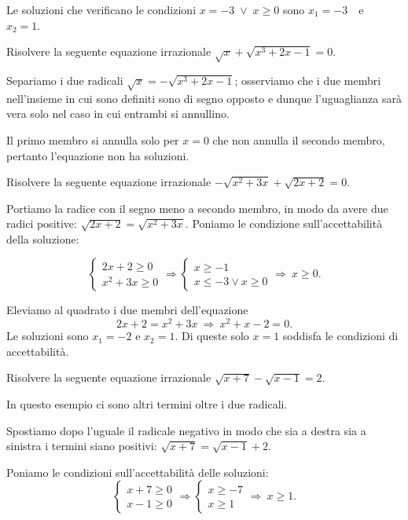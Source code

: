 \begin{exrig}
\begin{esempio}
Le soluzioni che verificano le condizioni $x=-3\;\vee\; x\ge 0$ sono $x_1=-3$~~e~~$x_2=1$.
\end{esempio}
\begin{esempio}
Risolvere la seguente equazione irrazionale $\sqrt x+\sqrt{x^3+2x-1}=0$.

Separiamo i due radicali $\sqrt x=-\sqrt{x^3+2x-1}$; osserviamo che i due membri nell'insieme in cui sono definiti sono di segno opposto e dunque l'uguaglianza sarà vera solo nel caso in cui entrambi si annullino.

Il primo membro si annulla solo per $x=0$ che non annulla il secondo membro, pertanto l'equazione non ha soluzioni.
\end{esempio}
\begin{esempio}
Risolvere la seguente equazione irrazionale $-\sqrt{x^2+3x}+\sqrt{2x+2}=0$.

Portiamo la radice con il segno meno a secondo membro, in modo da avere due radici positive:
$\sqrt{2x+2}=\sqrt{x^2+3x}$. Poniamo le condizione sull'accettabilità della soluzione:

\begin{equation*}
\left\{\begin{array}{l}{2x+2\ge 0}\\{x^2+3x\ge 0}\end{array}\right. \Rightarrow \left\{\begin{array}{l}{x\ge -1}\\{x\le -3\vee x\ge 0}\end{array}\right.\Rightarrow\: x\ge 0.
\end{equation*}

Eleviamo al quadrato i due membri dell'equazione 
\[2x+2=x^2+3x\:\Rightarrow\: x^2+x-2=0.\]
Le soluzioni sono $x_1=-2$ e $x_2=1$. Di queste solo $x=1$ soddisfa le condizioni di accettabilità.
\end{esempio}

\begin{esempio}
Risolvere la seguente equazione irrazionale $\sqrt{x+7}-\sqrt{x-1}=2$.

In questo esempio ci sono altri termini oltre i due radicali.

Spostiamo dopo l'uguale il radicale negativo in modo che sia a destra sia a sinistra i termini siano positivi: $\sqrt{x+7}=\sqrt{x-1}+2$.

Poniamo le condizioni sull'accettabilità delle soluzioni: \[ \left\{\begin{array}{l}{x+7\ge 0}\\{x-1\ge 0}\end{array}\right.\Rightarrow \left\{\begin{array}{l}{x\ge -7}\\{x\ge 1}\end{array}\right.\Rightarrow\: x\ge 1. \]


\end{esempio}
\end{exrig}
